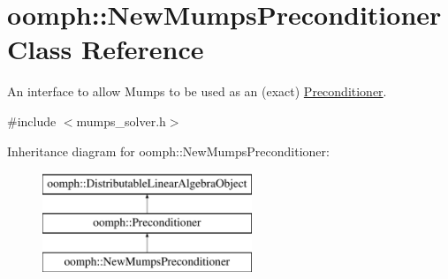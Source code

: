 \hypertarget{classoomph_1_1NewMumpsPreconditioner}{}\section{oomph\+:\+:New\+Mumps\+Preconditioner Class Reference}
\label{classoomph_1_1NewMumpsPreconditioner}


An interface to allow Mumps to be used as an (exact) \hyperlink{classoomph_1_1Preconditioner}{Preconditioner}.  




{\ttfamily \#include $<$mumps\+\_\+solver.\+h$>$}

Inheritance diagram for oomph\+:\+:New\+Mumps\+Preconditioner\+:\begin{figure}[H]
\begin{center}
\leavevmode
\includegraphics[height=3.000000cm]{classoomph_1_1NewMumpsPreconditioner}
\end{center}
\end{figure}
